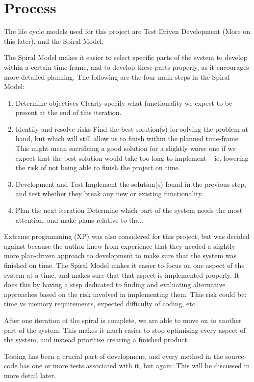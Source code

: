 \newpage
\section{Process}
The life cycle models used for this project are Test Driven Development (More on this later), and the Spiral Model.

The Spiral Model makes it easier to select specific parts of the system to develop within a certain time-frame, and to develop these parts properly, as it encourages more detailed planning. The following are the four main steps in the Spiral Model:
\begin{enumerate}
	\item Determine objectives
	\subitem Clearly specify what functionality we expect to be present at the end of this iteration.
	\item Identify and resolve risks
	\subitem Find the best solution(s) for solving the problem at hand, but which will still allow us to finish within the planned time-frame
	\subsubitem This might mean sacrificing a good solution for a slightly worse one if we expect that the best solution would take too long to implement -- ie. lowering the risk of not being able to finish the project on time.
	\item Development and Test
	\subitem Implement the solution(s) found in the previous step, and test whether they break any new or existing functionality.
	\item Plan the next iteration
	\subitem Determine which part of the system needs the most attention, and make plans relative to that.
\end{enumerate}

Extreme programming (XP) was also considered for this project, but was decided against because the author knew from experience that they needed a slightly more plan-driven approach to development to make sure that the system was finished on time. The Spiral Model makes it easier to focus on one aspect of the system at a time, and makes sure that that aspect is implemented properly. It does this by having a step dedicated to finding and evaluating alternative approaches based on the risk involved in implementing them. This risk could be: time vs memory requirements, expected difficulty of coding, etc.

After one iteration of the spiral is complete, we are able to move on to another part of the system. This makes it much easier to stop optimising every aspect of the system, and instead prioritise creating a finished product.

Testing has been a crucial part of development, and every method in the source-code has one or more tests associated with it, but again: This will be discussed in more detail later. 
